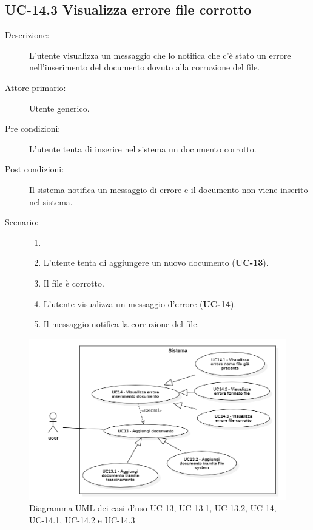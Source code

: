 \subsection{UC-14.3 Visualizza errore file corrotto}
\begin{description}
    \item[Descrizione:] L'utente visualizza un messaggio che lo notifica che c'è stato un errore nell'inserimento del documento dovuto alla corruzione del file.
    \item[Attore primario:] Utente generico.
    \item[Pre condizioni:] L'utente tenta di inserire nel sistema un documento corrotto.
    \item[Post condizioni:] Il sistema notifica un messaggio di errore e il documento non viene inserito nel sistema.
    \item[Scenario:]
    \begin{enumerate}
        \item[]
        \item L’utente tenta di aggiungere un nuovo documento (\textbf{UC-13}).
        \item Il file è corrotto.
        \item L'utente visualizza un messaggio d'errore (\textbf{UC-14}).
        \item Il messaggio notifica la corruzione del file.
    \end{enumerate}
\end{description}

\begin{figure}[H]
    \centering
    \includegraphics[width=\linewidth]{UC13-14.png}
    \caption{Diagramma UML dei casi d'uso UC-13, UC-13.1, UC-13.2, UC-14, UC-14.1, UC-14.2 e UC-14.3}
    \label{fig:UC13-14}
\end{figure}

